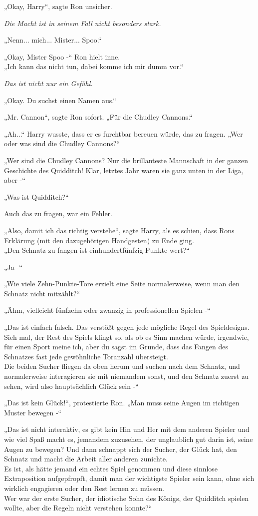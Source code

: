 {„Okay, Harry“, sagte Ron unsicher.

\emph{Die Macht ist in seinem Fall nicht besonders stark.}

„Nenn... mich... Mister... Spoo.“

„Okay, Mister Spoo -“ Ron hielt inne.\\ „Ich kann das nicht tun, dabei komme ich mir dumm vor.“

\emph{Das ist nicht nur ein Gefühl.}

„Okay. Du suchst einen Namen aus.“

„Mr. Cannon“, sagte Ron sofort. „Für die Chudley Cannons.“

„Ah...“ Harry wusste, dass er es furchtbar bereuen würde, das zu fragen. „Wer oder was sind die Chudley Cannons?“

„Wer sind die Chudley Cannons? Nur die brillanteste Mannschaft in der ganzen Geschichte des Quidditch! Klar, letztes Jahr waren sie ganz unten in der Liga, aber -“

„Was ist Quidditch?“

Auch das zu fragen, war ein Fehler.

„Also, damit ich das richtig verstehe“, sagte Harry, als es schien, dass Rons Erklärung (mit den dazugehörigen Handgesten) zu Ende ging.\\ „Den Schnatz zu fangen ist einhundertfünfzig Punkte wert?“

„Ja -“

„Wie viele Zehn-Punkte-Tore erzielt eine Seite normalerweise, wenn man den Schnatz nicht mitzählt?“

„Ähm, vielleicht fünfzehn oder zwanzig in professionellen Spielen -“

„Das ist einfach falsch. Das verstößt gegen jede mögliche Regel des Spieldesigns. Sieh mal, der Rest des Spiels klingt so, als ob es Sinn machen würde, irgendwie, für einen Sport meine ich, aber du sagst im Grunde, dass das Fangen des Schnatzes fast jede gewöhnliche Toranzahl übersteigt.\\ Die beiden Sucher fliegen da oben herum und suchen nach dem Schnatz, und normalerweise interagieren sie mit niemandem sonst, und den Schnatz zuerst zu sehen, wird also hauptsächlich Glück sein -“

„Das ist kein Glück!“, protestierte Ron. „Man muss seine Augen im richtigen Muster bewegen -“

„Das ist nicht interaktiv, es gibt kein Hin und Her mit dem anderen Spieler und wie viel Spaß macht es, jemandem zuzusehen, der unglaublich gut darin ist, seine Augen zu bewegen? Und dann schnappt sich der Sucher, der Glück hat, den Schnatz und macht die Arbeit aller anderen zunichte.\\ Es ist, als hätte jemand ein echtes Spiel genommen und diese sinnlose Extraposition aufgepfropft, damit man der wichtigste Spieler sein kann, ohne sich wirklich engagieren oder den Rest lernen zu müssen.\\ Wer war der erste Sucher, der idiotische Sohn des Königs, der Quidditch spielen wollte, aber die Regeln nicht verstehen konnte?“

}
